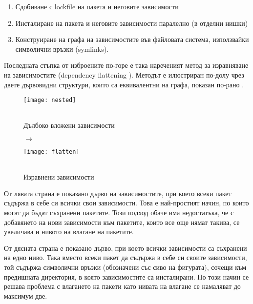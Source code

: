 \begin{enumerate}
    \item Сдобиване с lockfile на пакета и неговите зависимости
    \item Инсталиране на пакета и неговите зависимости паралелно (в отделни
          нишки)
    \item Конструиране на графа на зависимостите във файловата система,
          използвайки символични връзки (symlinks).
\end{enumerate}

Последната стъпка от изброените по-горе е така нареченият метод за изравняване
на зависимостите (dependency flattening \cite{npm}). Методът е илюстриран
по-долу чрез двете дървовидни структури, които са еквивалентни на графа, показан
по-рано .

\begin{figure}[H]
    \centering
    \begin{minipage}{0.4\textwidth}
        \centering
        \texttt{[image: nested]}
        \captionsetup{justification=centering}
        \caption{\\Дълбоко вложени зависимости}
        \label{fig:nested}
    \end{minipage}
    \begin{minipage}{0.05\textwidth}
        \centering
        $ \longrightarrow $
    \end{minipage}
    \begin{minipage}{0.4\textwidth}
        \centering
        \texttt{[image: flatten]}
        \captionsetup{justification=centering}
        \caption{\\Изравнени зависимости}
        \label{fig:flatten}
    \end{minipage}
\end{figure}

От лявата страна  е показано дърво на зависимостите, при
което всеки пакет съдържа в себе си всички свои зависимости. Това е
най-простият начин, по които могат да бъдат съхранени пакетите. Този подход
обаче има недостатъка, че с добавянето на нови зависимости към пакетите, които
все още нямат такива, се увеличава и нивото на влагане на пакетите.

От дясната страна  е показано дърво, при което всички
зависимости са съхранени на едно ниво. Така вместо всеки пакет да съдържа в себе
си своите зависимости, той съдържа символични връзки (обозначени със сиво на
фигурата), сочещи към предишната директория, в която зависимостите са
инсталирани. По този начин се решава проблема с влагането на пакети като нивата
на влагане се намаляват до максимум две.

